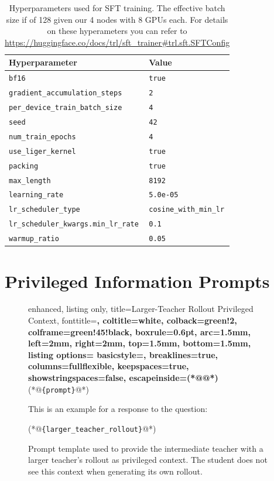 \begin{table}[htbp]
    \centering
    \small
    \begin{tabular}{ll}
        \toprule
        Hyperparameter & Value \\
        \midrule
        \texttt{bf16} & \texttt{true} \\
        \texttt{gradient\_accumulation\_steps} & \texttt{2} \\
        \texttt{per\_device\_train\_batch\_size} & \texttt{4} \\
        \texttt{seed} & \texttt{42} \\
        \texttt{num\_train\_epochs} & \texttt{4} \\
        \texttt{use\_liger\_kernel} & \texttt{true} \\
        \texttt{packing} & \texttt{true} \\
        \texttt{max\_length} & \texttt{8192} \\
        \texttt{learning\_rate} & \texttt{5.0e-05} \\
        \texttt{lr\_scheduler\_type} & \texttt{cosine\_with\_min\_lr} \\
        \texttt{lr\_scheduler\_kwargs.min\_lr\_rate} & \texttt{0.1} \\
        \texttt{warmup\_ratio} & \texttt{0.05} \\
        \bottomrule
    \end{tabular}
    \caption{Hyperparameters used for SFT training. The effective batch size if of 128 given our 4 nodes with 8 GPUs each. For details on these hyperameters you can refer to \protect\url{https://huggingface.co/docs/trl/sft_trainer\#trl.sft.SFTConfig}}
    \label{tab:sft_hyperparameters}
\end{table}

\FloatBarrier

\section{Privileged Information Prompts} \label{app: pc_prompts}

\begin{figure}
    \centering
\begin{tcblisting}{
    enhanced,
    listing only,
    title={Larger-Teacher Rollout Privileged Context},
    fonttitle=\bfseries,
    coltitle=white,
    colback=green!2,
    colframe=green!45!black,
    boxrule=0.6pt,
    arc=1.5mm,
    left=2mm,
    right=2mm,
    top=1.5mm,
    bottom=1.5mm,
    listing options={
        basicstyle=\ttfamily\scriptsize,
        breaklines=true,
        columns=fullflexible,
        keepspaces=true,
        showstringspaces=false,
        escapeinside={(*@}{@*)}
    }
}
(*@\textcolor{blue!70!black}{\texttt{\{prompt\}}}@*)

This is an example for a response to the question:

(*@\textcolor{blue!70!black}{\texttt{\{larger\_teacher\_rollout\}}}@*)
\end{tcblisting}
    \caption{Prompt template used to provide the intermediate teacher with a larger teacher's rollout as privileged context. The student does not see this context when generating its own rollout.}
    \label{fig: pc_rollout_example}
\end{figure}
